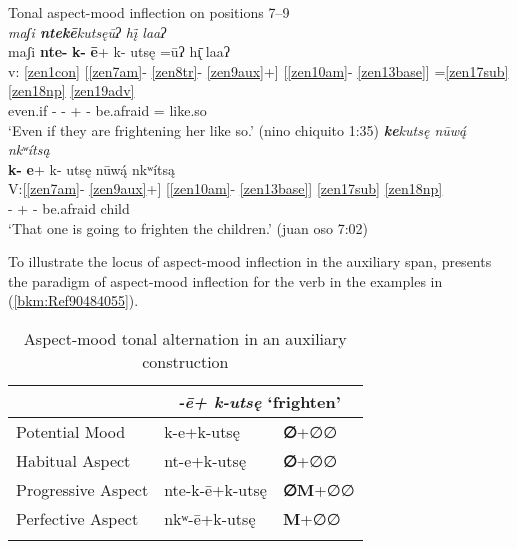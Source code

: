 \documentclass[output=paper]{langscibook}
\begin{document}
\ea\label{bkm:Ref90484055}Tonal aspect-mood inflection on positions 7{}--9\\
                \ea\label{chatino:ex:key:28a} { 
                \textit{maʃi \textbf{ntekē}kutsęūʔ hį̄ laaʔ} \\  
                \glll {} maʃi \textbf{nte-} \textbf{k-} \textbf{ē}+ k- utsę =ūʔ h\={\k{ı}} laaʔ\\
                v: \ref{zen1con} [\ref{zen7am}{}- \ref{zen8tr}{}- \ref{zen9aux}+] [\ref{zen10am}{}- \ref{zen13base}] =\ref{zen17sub} \ref{zen18np} \ref{zen19adv} \\
                {} even.if \Prog{}- \Pot{}- \Caus{}+ \Pot{}- be.afraid =\Third\Nspec{} \Obj{} like.so\\ 
                \glt `Even if they are frightening her like so.' (nino chiquito 1:35)
                }
                \ex\label{chatino:ex:key:28b} { 
                \textit{\textbf{ke}kutsę nūw\'{ą} nkʷítsą}\\
                \glll \textbf{k-} \textbf{e}+ k- utsę nūw\'{ą} nkʷítsą\\
                V:[\ref{zen7am}{}- \ref{zen9aux}+] [\ref{zen10am}{}- \ref{zen13base}] \ref{zen17sub} \ref{zen18np} \\
                \Pot{}- \Caus{}+ \Pot{}- be.afraid \Third\Dist{} child\\
                \glt `That one is going to frighten the children.' (juan oso 7:02)
                }
                \z 
\z 

To illustrate the locus of aspect-mood inflection in the auxiliary span,  presents the paradigm of aspect-mood inflection for the verb in the examples in (\ref{bkm:Ref90484055}).

\begin{table}
    \caption{Aspect-mood tonal alternation in an auxiliary construction}
    \label{tab:zenz:key:5}
     {
    \begin{tabular}{lll}
         \lsptoprule
                        & \multicolumn{2}{c}{\textit{{}-}\textbf{\textit{ē}}\textit{+ k-utsę} `frighten'} \\ \midrule
    Potential Mood      & k-e+k-utsę    & \textbf{∅}+∅∅\\
    Habitual Aspect     & nt-e+k-utsę   & \textbf{∅}+∅∅\\
    Progressive Aspect  & nte-k-ē+k-utsę    & \textbf{∅M}+∅∅\\
    Perfective Aspect   & nkʷ-ē+k-utsę      & \textbf{M}+∅∅\\
\lspbottomrule
    \end{tabular}
    }
\end{table}
\end{document}
